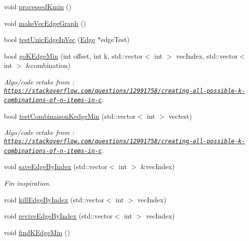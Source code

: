 \begin{DoxyCompactItemize}
void \mbox{\hyperlink{struct_algorithm_a659a436333cd45d8a3c9b5a6b83ca262}{processed\+Kmin}} ()
\item 
void \mbox{\hyperlink{struct_algorithm_a0baa64983c2bc5762470691ec5911910}{make\+Vec\+Edge\+Graph}} ()
\item 
bool \mbox{\hyperlink{struct_algorithm_a2f0d23d667515747f55fc21c359c2fb1}{test\+Unic\+Edge\+In\+Vec}} (\mbox{\hyperlink{class_edge}{Edge}} $\ast$edge\+Test)
\item 
bool \mbox{\hyperlink{struct_algorithm_a4f5902055c640f4ec1a037e7c24cb772}{go\+K\+Edge\+Min}} (int offset, int k, std\+::vector$<$ int $>$ vec\+Index, std\+::vector$<$ int $>$ \&combination)
\begin{DoxyCompactList}\small\item\em Algo/code retake from \+: \href{https://stackoverflow.com/questions/12991758/creating-all-possible-k-combinations-of-n-items-in-c}{\tt https\+://stackoverflow.\+com/questions/12991758/creating-\/all-\/possible-\/k-\/combinations-\/of-\/n-\/items-\/in-\/c}. \end{DoxyCompactList}\item 
bool \mbox{\hyperlink{struct_algorithm_a7ada217d91dc5b83c84c851ec4441433}{test\+Combinaison\+Kedge\+Min}} (std\+::vector$<$ int $>$ vectest)
\begin{DoxyCompactList}\small\item\em Algo/code retake from \+: \href{https://stackoverflow.com/questions/12991758/creating-all-possible-k-combinations-of-n-items-in-c}{\tt https\+://stackoverflow.\+com/questions/12991758/creating-\/all-\/possible-\/k-\/combinations-\/of-\/n-\/items-\/in-\/c}. \end{DoxyCompactList}\item 
void \mbox{\hyperlink{struct_algorithm_a946680d5d61db2c1f71ee80f95e6436e}{save\+Edge\+By\+Index}} (std\+::vector$<$ int $>$ \&vec\+Index)
\begin{DoxyCompactList}\small\item\em Fin inspiration. \end{DoxyCompactList}\item 
void \mbox{\hyperlink{struct_algorithm_a4527b9ab55d27dcaf015181bb3e1b99a}{kill\+Edge\+By\+Index}} (std\+::vector$<$ int $>$ vec\+Index)
\item 
void \mbox{\hyperlink{struct_algorithm_a698172d74eea712bc92a75375a1de946}{revive\+Edge\+By\+Index}} (std\+::vector$<$ int $>$ vec\+Index)
\item 
void \mbox{\hyperlink{struct_algorithm_ae0961d8c30105f3ea9db598f2548bdb9}{find\+K\+Edge\+Min}} ()

\end{DoxyCompactItemize}
